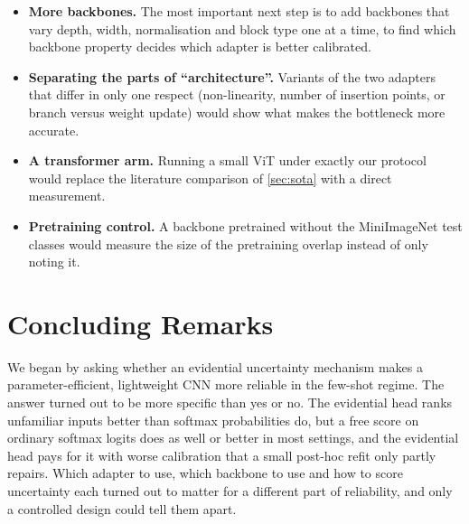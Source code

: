 \begin{itemize}
\item \textbf{More backbones.} The most important next step is to add backbones that vary depth, width,
normalisation and block type one at a time, to find which backbone property decides which adapter is better
calibrated.
\item \textbf{Separating the parts of ``architecture''.} Variants of the two adapters that differ in only one
respect (non-linearity, number of insertion points, or branch versus weight update) would show what makes
the bottleneck more accurate.
\item \textbf{A transformer arm.} Running a small ViT under exactly our protocol would replace the
literature comparison of \cref{sec:sota} with a direct measurement.
\item \textbf{Pretraining control.} A backbone pretrained without the MiniImageNet test classes would measure
the size of the pretraining overlap instead of only noting it.
\end{itemize}

\section{Concluding Remarks}

We began by asking whether an evidential uncertainty mechanism makes a parameter-efficient, lightweight CNN
more reliable in the few-shot regime. The answer turned out to be more specific than yes or no. The
evidential head ranks unfamiliar inputs better than softmax probabilities do, but a free score on ordinary
softmax logits does as well or better in most settings, and the evidential head pays for it with worse calibration that a
small post-hoc refit only partly repairs. Which adapter to use, which backbone to use and how to score
uncertainty each turned out to matter for a different part of reliability, and only a controlled design
could tell them apart.
